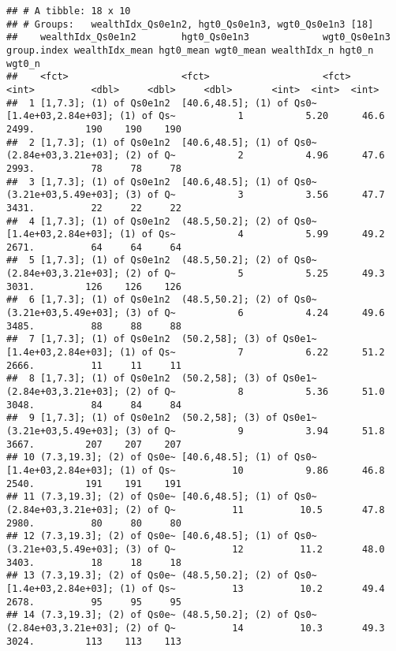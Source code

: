 \documentclass[
]{book}
\begin{document}
\begin{verbatim}
## # A tibble: 18 x 10
## # Groups:   wealthIdx_Qs0e1n2, hgt0_Qs0e1n3, wgt0_Qs0e1n3 [18]
##    wealthIdx_Qs0e1n2        hgt0_Qs0e1n3             wgt0_Qs0e1n3                   group.index wealthIdx_mean hgt0_mean wgt0_mean wealthIdx_n hgt0_n wgt0_n
##    <fct>                    <fct>                    <fct>                                <int>          <dbl>     <dbl>     <dbl>       <int>  <int>  <int>
##  1 [1,7.3]; (1) of Qs0e1n2  [40.6,48.5]; (1) of Qs0~ [1.4e+03,2.84e+03]; (1) of Qs~           1           5.20      46.6     2499.         190    190    190
##  2 [1,7.3]; (1) of Qs0e1n2  [40.6,48.5]; (1) of Qs0~ (2.84e+03,3.21e+03]; (2) of Q~           2           4.96      47.6     2993.          78     78     78
##  3 [1,7.3]; (1) of Qs0e1n2  [40.6,48.5]; (1) of Qs0~ (3.21e+03,5.49e+03]; (3) of Q~           3           3.56      47.7     3431.          22     22     22
##  4 [1,7.3]; (1) of Qs0e1n2  (48.5,50.2]; (2) of Qs0~ [1.4e+03,2.84e+03]; (1) of Qs~           4           5.99      49.2     2671.          64     64     64
##  5 [1,7.3]; (1) of Qs0e1n2  (48.5,50.2]; (2) of Qs0~ (2.84e+03,3.21e+03]; (2) of Q~           5           5.25      49.3     3031.         126    126    126
##  6 [1,7.3]; (1) of Qs0e1n2  (48.5,50.2]; (2) of Qs0~ (3.21e+03,5.49e+03]; (3) of Q~           6           4.24      49.6     3485.          88     88     88
##  7 [1,7.3]; (1) of Qs0e1n2  (50.2,58]; (3) of Qs0e1~ [1.4e+03,2.84e+03]; (1) of Qs~           7           6.22      51.2     2666.          11     11     11
##  8 [1,7.3]; (1) of Qs0e1n2  (50.2,58]; (3) of Qs0e1~ (2.84e+03,3.21e+03]; (2) of Q~           8           5.36      51.0     3048.          84     84     84
##  9 [1,7.3]; (1) of Qs0e1n2  (50.2,58]; (3) of Qs0e1~ (3.21e+03,5.49e+03]; (3) of Q~           9           3.94      51.8     3667.         207    207    207
## 10 (7.3,19.3]; (2) of Qs0e~ [40.6,48.5]; (1) of Qs0~ [1.4e+03,2.84e+03]; (1) of Qs~          10           9.86      46.8     2540.         191    191    191
## 11 (7.3,19.3]; (2) of Qs0e~ [40.6,48.5]; (1) of Qs0~ (2.84e+03,3.21e+03]; (2) of Q~          11          10.5       47.8     2980.          80     80     80
## 12 (7.3,19.3]; (2) of Qs0e~ [40.6,48.5]; (1) of Qs0~ (3.21e+03,5.49e+03]; (3) of Q~          12          11.2       48.0     3403.          18     18     18
## 13 (7.3,19.3]; (2) of Qs0e~ (48.5,50.2]; (2) of Qs0~ [1.4e+03,2.84e+03]; (1) of Qs~          13          10.2       49.4     2678.          95     95     95
## 14 (7.3,19.3]; (2) of Qs0e~ (48.5,50.2]; (2) of Qs0~ (2.84e+03,3.21e+03]; (2) of Q~          14          10.3       49.3     3024.         113    113    113

\end{verbatim}
\end{document}
